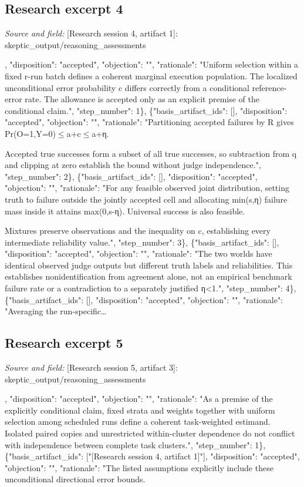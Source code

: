 \documentclass[11pt]{article}
\begin{document}
\subsection{Research excerpt 4}
\textit{Source and field: }[Research session 4, artifact 1]: skeptic\_output/reasoning\_assessments\par
[\{"basis\_artifact\_ids": [], "disposition": "accepted", "objection": "", "rationale": "Uniform selection within a fixed r-run batch defines a coherent marginal execution population. The localized unconditional error probability c differs correctly from a conditional reference-error rate. The allowance is accepted only as an explicit premise of the conditional claim.", "step\_number": 1\}, \{"basis\_artifact\_ids": [], "disposition": "accepted", "objection": "", "rationale": "Partitioning accepted failures by R gives Pr(O=1,Y=0)$\leq$a+c$\leq$a+η.

Accepted true successes form a subset of all true successes, so subtraction from q and clipping at zero establish the bound without judge independence.", "step\_number": 2\}, \{"basis\_artifact\_ids": [], "disposition": "accepted", "objection": "", "rationale": "For any feasible observed joint distribution, setting truth to failure outside the jointly accepted cell and allocating min(s,η) failure mass inside it attains max(0,s-η). Universal success is also feasible.

Mixtures preserve observations and the inequality on c, establishing every intermediate reliability value.", "step\_number": 3\}, \{"basis\_artifact\_ids": [], "disposition": "accepted", "objection": "", "rationale": "The two worlds have identical observed judge outputs but different truth labels and reliabilities. This establishes nonidentification from agreement alone, not an empirical benchmark failure rate or a contradiction to a separately justified η\textless{}1.", "step\_number": 4\}, \{"basis\_artifact\_ids": [], "disposition": "accepted", "objection": "", "rationale": "Averaging the run-specific\ldots{}

\subsection{Research excerpt 5}
\textit{Source and field: }[Research session 5, artifact 3]: skeptic\_output/reasoning\_assessments\par
[\{"basis\_artifact\_ids": [], "disposition": "accepted", "objection": "", "rationale": "As a premise of the explicitly conditional claim, fixed strata and weights together with uniform selection among scheduled runs define a coherent task-weighted estimand. Isolated paired copies and unrestricted within-cluster dependence do not conflict with independence between complete task clusters.", "step\_number": 1\}, \{"basis\_artifact\_ids": ["[Research session 4, artifact 1]"], "disposition": "accepted", "objection": "", "rationale": "The listed assumptions explicitly include these unconditional directional error bounds.
\end{document}
